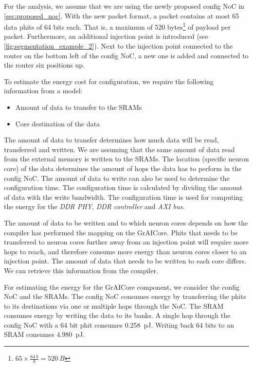 For the analysis, we assume that we are using the newly proposed config NoC in \cref{sec:proposed_noc}. 
With the new packet format, a packet contains at most 65 data phits of 64 bits each.
That is, a maximum of 520 bytes\footnote{$65 \times \frac{\SI{64}{b}}{8} = \SI{520}{B}$} of payload per packet.
Furthermore, an additional injection point is introduced (see \cref{fig:segmentation_example_2}).
Next to the injection point connected to the router on the bottom left of the config NoC, a new one is added and connected to the router six positions up.

To estimate the energy cost for configuration, we require the following information from a model:
\begin{itemize}
    \item Amount of data to transfer to the SRAMs
    \item Core destination of the data
\end{itemize}

The amount of data to transfer determines how much data will be read, transferred and written.
We are assuming that the same amount of data read from the external memory is written to the SRAMs.
The location (specific neuron core) of the data determines the amount of hops the data has to perform in the config NoC.
The amount of data to write can also be used to determine the configuration time.
The configuration time is calculated by dividing the amount of data with the write bandwidth.
The configuration time is used for computing the energy for the \textit{DDR PHY}, \textit{DDR controller} and \textit{AXI bus}.

The amount of data to be written and to which neuron cores depends on how the compiler has performed the mapping on the GrAICore. %
Phits that needs to be transferred to neuron cores further away from an injection point will require more hops to reach, and therefore consume more energy than neuron cores closer to an injection point.
The amount of data that needs to be written to each core differs.
We can retrieve this information from the compiler.

For estimating the energy for the GrAICore component, we consider the config NoC and the SRAMs.
The config NoC consumes energy by transferring the phits to its destinations via one or multiple hops through the NoC.
The SRAM consumes energy by writing the data to its banks.
A single hop through the config NoC with a 64 bit phit consumes \SI{0.258}{pJ}.
Writing back 64 bits to an SRAM consumes \SI{4.980}{pJ}.

